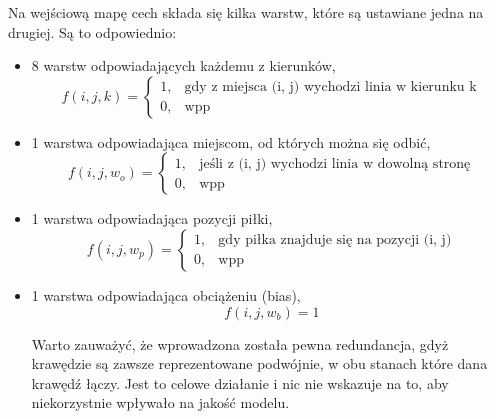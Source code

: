 \documentclass[licencjacka]{pracamgr}
\begin{document}
Na wejściową mapę cech składa się kilka warstw, które są ustawiane jedna na drugiej. Są to odpowiednio: 
\begin{itemize}
\item 8 warstw odpowiadających każdemu z kierunków,
$$ f(i, j, k) = 
\begin{cases}
    1,              & \text{gdy z miejsca (i, j) wychodzi linia w kierunku k}\\
    0,              & \text{wpp}
\end{cases}
$$
\item 1 warstwa odpowiadająca miejscom, od których można się odbić,
$$ f(i, j, w_o) = 
\begin{cases}
    1,              & \text{jeśli z (i, j) wychodzi linia w dowolną stronę} \\
    0,              & \text{wpp} 
\end{cases}
$$
\item 1 warstwa odpowiadająca pozycji piłki,
$$ f(i, j, w_p) = 
\begin{cases}
    1,              & \text{gdy piłka znajduje się na pozycji (i, j)}\\
    0,              & \text{wpp}
\end{cases}
$$

\item 1 warstwa odpowiadająca obciążeniu (bias),
$$ f(i, j, w_b) = 1 $$

Warto zauważyć, że wprowadzona została pewna redundancja, gdyż krawędzie są zawsze reprezentowane podwójnie, w obu stanach które dana krawędź łączy. Jest to celowe działanie i nic nie wskazuje na to, aby niekorzystnie wpływało na jakość modelu.


\end{itemize}
\end{document}

